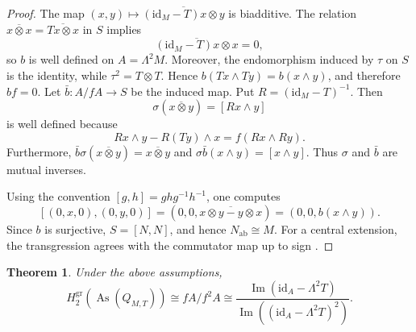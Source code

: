 \documentclass[10pt,a4paper]{amsart}
\newtheorem{theorem}{Theorem}[section]
\DeclareMathOperator{\As}{As}
\newcommand{\gr}{\mathrm{gr}}
\newcommand{\ab}{\mathrm{ab}}
\begin{document}
\begin{proof}
The map
$(x,y)\mapsto\overline{(\mathrm{id}_M-T)x\otimes y}$ is biadditive. The
relation $\overline{x\otimes x}=\overline{Tx\otimes x}$ in $S$ implies
\[
 \overline{(\mathrm{id}_M-T)x\otimes x}=0,
\]
so $b$ is well defined on $A=\Lambda^2M$. Moreover, the endomorphism induced
by $\tau$ on $S$ is the identity, while $\tau^2=T\otimes T$. Hence
$b(Tx\wedge Ty)=b(x\wedge y)$, and therefore $bf=0$. Let
$\bar b\colon A/fA\to S$ be the induced map. Put
$R=(\mathrm{id}_M-T)^{-1}$. Then
\[
 \sigma(\overline{x\otimes y})=[Rx\wedge y]
\]
is well defined because
\[
 Rx\wedge y-R(Ty)\wedge x=f(Rx\wedge Ry).
\]
Furthermore,
$\bar b\sigma(\overline{x\otimes y})=\overline{x\otimes y}$ and
$\sigma\bar b(x\wedge y)=[x\wedge y]$. Thus $\sigma$ and $\bar b$ are
mutual inverses.

Using the convention $[g,h]=ghg^{-1}h^{-1}$, one computes
\[
 [(0,x,0),(0,y,0)]
 =(0,0,\overline{x\otimes y-y\otimes x})
 =(0,0,b(x\wedge y)).
\]
Since $b$ is surjective, $S=[N,N]$, and hence $N_{\ab}\cong M$. For a
central extension, the transgression agrees with the commutator map up to
sign \cite[Chapter~VII, \S6]{Brown}.
\end{proof}

\begin{theorem}
\label{thm:alexander-h2-associated}
Under the above assumptions,
\[
H_2^{\gr}(\As(Q_{M,T}))
        \cong fA/f^2A
        \cong
        \frac{\operatorname{Im}(\mathrm{id}_A-\Lambda^2T)}
        {\operatorname{Im}((\mathrm{id}_A-\Lambda^2T)^2)}.
\]
\end{theorem}
\end{document}
